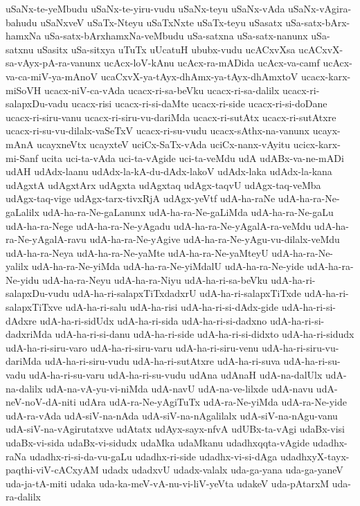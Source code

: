 {uSaNx-te-yeMbudu
uSaNx-te-yiru-vudu
uSaNx-teyu
uSaNx-vAda
uSaNx-vAgira-bahudu
uSaNxveV
uSaTx-Nteyu
uSaTxNxte
uSaTx-teyu
uSasatx
uSa-satx-bArx-hamxNa
uSa-satx-bArxhamxNa-veMbudu
uSa-satxna
uSa-satx-nanunx
uSa-satxnu
uSasitx
uSa-sitxya
uTuTx
uUcatuH
ububx-vudu
ucACxvXsa
ucACxvX-sa-vAyx-pA-ra-vanunx
ucAcx-loV-kAnu
ucAcx-ra-mADida
ucAcx-va-camf
ucAcx-va-ca-miV-ya-mAnoV
ucaCxvX-ya-tAyx-dhAmx-ya-tAyx-dhAmxtoV
ucacx-karx-miSoVH
ucacx-niV-ca-vAda
ucacx-ri-sa-beVku
ucacx-ri-sa-dalilx
ucacx-ri-salapxDu-vadu
ucacx-risi
ucacx-ri-si-daMte
ucacx-ri-side
ucacx-ri-si-doDane
ucacx-ri-siru-vanu
ucacx-ri-siru-vu-dariMda
ucacx-ri-sutAtx
ucacx-ri-sutAtxre
ucacx-ri-su-vu-dilalx-vaSeTxV
ucacx-ri-su-vudu
ucacx-sAthx-na-vanunx
ucayx-mAnA
ucayxneVtx
ucayxteV
uciCx-SaTx-vAda
uciCx-nanx-vAyitu
ucicx-karx-mi-Sanf
ucita
uci-ta-vAda
uci-ta-vAgide
uci-ta-veMdu
udA
udABx-va-ne-mADi
udAH
udAdx-laanu
udAdx-la-kA-du-dAdx-lakoV
udAdx-laka
udAdx-la-kana
udAgxtA
udAgxtArx
udAgxta
udAgxtaq
udAgx-taqvU
udAgx-taq-veMba
udAgx-taq-vige
udAgx-tarx-tivxRjA
udAgx-yeVtf
udA-ha-raNe
udA-ha-ra-Ne-gaLalilx
udA-ha-ra-Ne-gaLanunx
udA-ha-ra-Ne-gaLiMda
udA-ha-ra-Ne-gaLu
udA-ha-ra-Nege
udA-ha-ra-Ne-yAgadu
udA-ha-ra-Ne-yAgalA-ra-veMdu
udA-ha-ra-Ne-yAgalA-ravu
udA-ha-ra-Ne-yAgive
udA-ha-ra-Ne-yAgu-vu-dilalx-veMdu
udA-ha-ra-Neya
udA-ha-ra-Ne-yaMte
udA-ha-ra-Ne-yaMteyU
udA-ha-ra-Ne-yalilx
udA-ha-ra-Ne-yiMda
udA-ha-ra-Ne-yiMdalU
udA-ha-ra-Ne-yide
udA-ha-ra-Ne-yidu
udA-ha-ra-Neyu
udA-ha-ra-Niyu
udA-ha-ri-sa-beVku
udA-ha-ri-salapxDu-vudu
udA-ha-ri-salapxTiTxdadxrU
udA-ha-ri-salapxTiTxde
udA-ha-ri-salapxTiTxve
udA-ha-ri-salu
udA-ha-risi
udA-ha-ri-si-dAdx-gide
udA-ha-ri-si-dAdxre
udA-ha-ri-sidUdx
udA-ha-ri-sida
udA-ha-ri-si-dadxno
udA-ha-ri-si-dadxriMda
udA-ha-ri-si-danu
udA-ha-ri-side
udA-ha-ri-si-didxto
udA-ha-ri-sidudx
udA-ha-ri-siru-varo
udA-ha-ri-siru-varu
udA-ha-ri-siru-venu
udA-ha-ri-siru-vu-dariMda
udA-ha-ri-siru-vudu
udA-ha-ri-sutAtxre
udA-ha-ri-suva
udA-ha-ri-su-vadu
udA-ha-ri-su-varu
udA-ha-ri-su-vudu
udAna
udAnaH
udA-na-dalUlx
udA-na-dalilx
udA-na-vA-yu-vi-niMda
udA-navU
udA-na-ve-lilxde
udA-navu
udA-neV-noV-dA-niti
udAra
udA-ra-Ne-yAgiTuTx
udA-ra-Ne-yiMda
udA-ra-Ne-yide
udA-ra-vAda
udA-siV-na-nAda
udA-siV-na-nAgalilalx
udA-siV-na-nAgu-vanu
udA-siV-na-vAgirutatxve
udAtatx
udAyx-sayx-nfvA
udUBx-ta-vAgi
udaBx-visi
udaBx-vi-sida
udaBx-vi-sidudx
udaMka
udaMkanu
udadhxqqta-vAgide
udadhx-raNa
udadhx-ri-si-da-vu-gaLu
udadhx-ri-side
udadhx-vi-si-dAga
udadhxyX-tayx-paqthi-viV-cACxyAM
udadx
udadxvU
udadx-valalx
uda-ga-yana
uda-ga-yaneV
uda-ja-tA-miti
udaka
uda-ka-meV-vA-nu-vi-liV-yeVta
udakeV
uda-pAtarxM
uda-ra-dalilx
}
